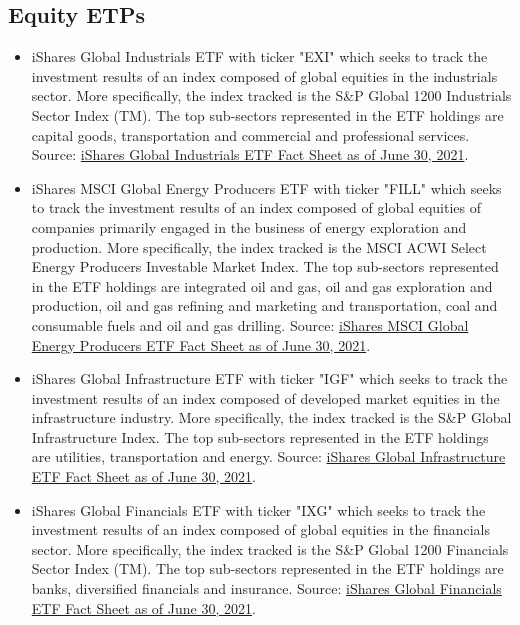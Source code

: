 \subsection*{Equity ETPs}
    \begin{itemize}
        \item iShares Global Industrials ETF with ticker "EXI" which seeks to track the investment results of an index composed of global equities in the industrials sector. More specifically, the index tracked is the S{\&}P Global 1200 Industrials Sector Index (TM). The top sub-sectors represented in the ETF holdings are capital goods, transportation and commercial and professional services. Source: \href{https://www.ishares.com/us/literature/fact-sheet/exi-ishares-global-industrials-etf-fund-fact-sheet-en-us.pdf}{iShares Global Industrials ETF Fact Sheet as of June 30, 2021}.%
        
        \item iShares MSCI Global Energy Producers ETF with ticker "FILL" which seeks to track the investment results of an index composed of global equities of companies primarily engaged in the business of energy exploration and production. More specifically, the index tracked is the MSCI ACWI Select Energy Producers Investable Market Index. The top sub-sectors represented in the ETF holdings are integrated oil and gas, oil and gas exploration and production, oil and gas refining and marketing and transportation, coal and consumable fuels and oil and gas drilling. Source: \href{https://www.ishares.com/us/literature/fact-sheet/fill-ishares-msci-global-energy-producers-etf-fund-fact-sheet-en-us.pdf}{iShares MSCI Global Energy Producers ETF Fact Sheet as of June 30, 2021}. %
        
        \item iShares Global Infrastructure ETF with ticker "IGF" which seeks to track the investment results of an index composed of developed market equities in the infrastructure industry. More specifically, the index tracked is the S{\&}P Global Infrastructure Index. The top sub-sectors represented in the ETF holdings are utilities, transportation and energy. Source: \href{https://www.ishares.com/us/literature/fact-sheet/igf-ishares-global-infrastructure-etf-fund-fact-sheet-en-us.pdf}{iShares Global Infrastructure ETF Fact Sheet as of June 30, 2021}.%
        
        \item iShares Global Financials ETF with ticker "IXG" which seeks to track the investment results of an index composed of global equities in the financials sector. More specifically, the index tracked is the S{\&}P Global 1200 Financials Sector Index (TM). The top sub-sectors represented in the ETF holdings are banks, diversified financials and insurance. Source: \href{https://www.ishares.com/us/literature/fact-sheet/ixg-ishares-global-financials-etf-fund-fact-sheet-en-us.pdf}{iShares Global Financials ETF Fact Sheet as of June 30, 2021}.%
        

\end{itemize}
